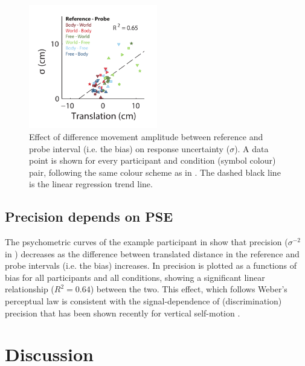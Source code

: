 \begin{figure}
    \includegraphics[width=0.5\textwidth]{src/paper3/figure5.pdf}

    \caption{Effect of difference movement amplitude between reference and probe interval (i.e. the bias) on response uncertainty ($\sigma$). A data point is shown for every participant and condition (symbol colour) pair, following the same colour scheme as in . The dashed black line is the linear regression trend line.}
    
    \label{p3:fig5}
\end{figure}

\subsection{Precision depends on PSE}
\label{p3:sec:precision}

The psychometric curves of the example participant in  show that precision ($\sigma^{-2}$ in ) decreases as the difference between translated distance in the reference and probe intervals (i.e. the bias) increases. In  precision is plotted as a functions of bias for all participants and all conditions, showing a significant linear relationship ($R^2 = 0.64$) between the two. This effect, which follows Weber's perceptual law \cite{fechner1860} is consistent with the signal-dependence of (discrimination) precision that has been shown recently for vertical self-motion \cite{nesti2014}.



\section{Discussion}

